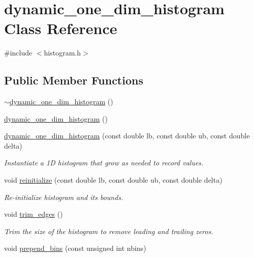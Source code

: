 \hypertarget{classdynamic__one__dim__histogram}{\section{dynamic\-\_\-one\-\_\-dim\-\_\-histogram Class Reference}
\label{classdynamic__one__dim__histogram}
}


{\ttfamily \#include $<$histogram.\-h$>$}

\subsection*{Public Member Functions}
\begin{DoxyCompactItemize}
\item 
\hyperlink{classdynamic__one__dim__histogram_a23aed9a23459cdee64422347878d81af}{$\sim$dynamic\-\_\-one\-\_\-dim\-\_\-histogram} ()
\item 
\hyperlink{classdynamic__one__dim__histogram_a361db85e9c1b246c24c4fdcba934de08}{dynamic\-\_\-one\-\_\-dim\-\_\-histogram} ()
\item 
\hyperlink{classdynamic__one__dim__histogram_a5c11c62055bece5d5bce48c27e8d8f99}{dynamic\-\_\-one\-\_\-dim\-\_\-histogram} (const double lb, const double ub, const double delta)
\begin{DoxyCompactList}\small\item\em Instantiate a 1\-D histogram that grow as needed to record values. \end{DoxyCompactList}\item 
void \hyperlink{classdynamic__one__dim__histogram_a899b4d0ab90f83506d12bc00c88a060a}{reinitialize} (const double lb, const double ub, const double delta)
\begin{DoxyCompactList}\small\item\em Re-\/initialize histogram and its bounds. \end{DoxyCompactList}\item 
void \hyperlink{classdynamic__one__dim__histogram_af03dc61101ae9d08b6f3474af04fbeeb}{trim\-\_\-edges} ()
\begin{DoxyCompactList}\small\item\em Trim the size of the histogram to remove leading and trailing zeros. \end{DoxyCompactList}\item 
void \hyperlink{classdynamic__one__dim__histogram_a03402a7219e10240803609fb6cbb24a6}{prepend\-\_\-bins} (const unsigned int nbins)

\end{DoxyCompactItemize}
